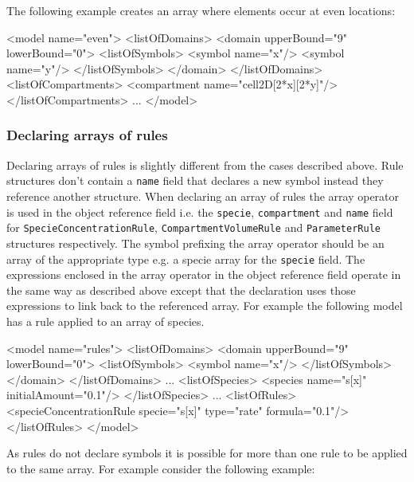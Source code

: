 \documentclass{cekarticle}
\begin{document}
The following example creates an array where elements occur at even locations:

\begin{example}
<model name="even">
    <listOfDomains>
        <domain upperBound="9" lowerBound="0">
            <listOfSymbols>
                <symbol name="x"/>
                <symbol name="y"/>
            </listOfSymbols>
        </domain>
    </listOfDomains>
    <listOfCompartments>
        <compartment name="cell2D[2*x][2*y]"/>
    </listOfCompartments>
    ...
</model>
\end{example}

\subsubsection{Declaring arrays of rules}

Declaring arrays of rules is slightly different from the cases
described above. Rule structures don't contain a \texttt{name}
field that declares a new symbol instead they reference another
structure.  When declaring an array of rules the array operator
is used in the object reference field i.e. the \texttt{specie},
\texttt{compartment} and \texttt{name} field for
\texttt{SpecieConcentrationRule}, \texttt{CompartmentVolumeRule}
and \texttt{ParameterRule} structures respectively. The symbol
prefixing the array operator should be an array of the appropriate
type e.g. a specie array for the \texttt{specie} field.  The
expressions enclosed in the array operator in the object
reference field operate in the same way as described above except
that the declaration uses those expressions to link back to the
referenced array.  For example the following model has a rule
applied to an array of species.

\begin{example}
<model name="rules">
    <listOfDomains>
        <domain upperBound="9" lowerBound="0">
            <listOfSymbols>
                <symbol name="x"/>
            </listOfSymbols>
        </domain>
    </listOfDomains>
    ...
    <listOfSpecies>
        <species name="s[x]" initialAmount="0.1"/>
    </listOfSpecies>
    ...
    <listOfRules>
        <specieConcentrationRule specie="s[x]" type="rate" formula="0.1"/>
    </listOfRules>
</model>
\end{example}

As rules do not declare symbols it is possible for more than one
rule to be applied to the same array. For example consider the
following example:
\end{document}
